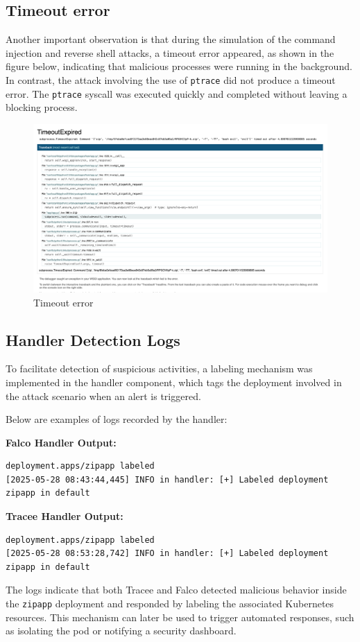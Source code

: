\subsection{Timeout error}
Another important observation is that during the simulation of the command injection and reverse shell attacks, a timeout error appeared, as shown in the figure below, indicating that malicious processes were running in the background. 
In contrast, the attack involving the use of \texttt{ptrace} did not produce a timeout error. The \texttt{ptrace} syscall was executed quickly and completed without leaving a blocking process. 

\begin{figure}[h!]
    \centering
    \includegraphics[width=0.5\linewidth]{images/timeout.png}
    \caption{Timeout error}
    \label{fig:enter-label}
\end{figure}
\subsection{Handler Detection Logs}
 To facilitate detection of suspicious activities, a labeling mechanism was implemented in the handler component, which tags the deployment involved in the attack scenario when an alert is triggered.

\noindent Below are examples of logs recorded by the handler:

\noindent \textbf{Falco Handler Output:}
\begin{verbatim}
deployment.apps/zipapp labeled
[2025-05-28 08:43:44,445] INFO in handler: [+] Labeled deployment zipapp in default
\end{verbatim}

\noindent \textbf{Tracee Handler Output:}
\begin{verbatim}
deployment.apps/zipapp labeled
[2025-05-28 08:53:28,742] INFO in handler: [+] Labeled deployment zipapp in default
\end{verbatim}

The logs indicate that both Tracee and Falco detected malicious behavior inside the \texttt{zipapp} deployment and responded by labeling the associated Kubernetes resources. This mechanism can later be used to trigger automated responses, such as isolating the pod or notifying a security dashboard.

